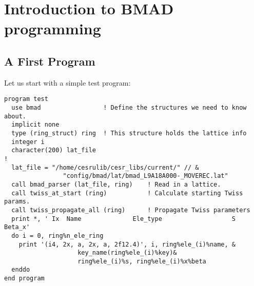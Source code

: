 \chapter{Introduction to BMAD programming}

\section{A First Program}


Let us start with a simple test program:
\begin{verbatim}
program test
  use bmad                 ! Define the structures we need to know about.
  implicit none
  type (ring_struct) ring  ! This structure holds the lattice info
  integer i
  character(200) lat_file
!
  lat_file = "/home/cesrulib/cesr_libs/current/" // &
                "config/bmad/lat/bmad_L9A18A000-_MOVEREC.lat"
  call bmad_parser (lat_file, ring)    ! Read in a lattice.
  call twiss_at_start (ring)           ! Calculate starting Twiss params.
  call twiss_propagate_all (ring)      ! Propagate Twiss parameters
  print *, ' Ix  Name              Ele_type                   S      Beta_x'
  do i = 0, ring%n_ele_ring
    print '(i4, 2x, a, 2x, a, 2f12.4)', i, ring%ele_(i)%name, &
                    key_name(ring%ele_(i)%key)&
                    ring%ele_(i)%s, ring%ele_(i)%x%beta
  enddo
end program
\end{verbatim}

